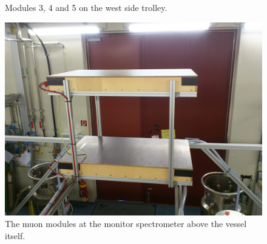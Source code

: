 \begin{figure}
\begin{minipage}{0.49\textwidth}
		\caption[East side modules]{Modules 3, 4 and 5 on the west side trolley. }
		\label{fig:westSide}
  	\end{minipage}
	
  \end{figure}

  
  \begin{figure}
	\begin{minipage}{0.3 \textwidth}
		\centering
		\includegraphics[width = \textwidth]{graphics/muonModules/monSpec/muonModules.jpg}
		\caption[Monitor spectrometer modules]{The muon modules at the monitor spectrometer above the vessel itself. }
		\label{fig:monSpecPanels}
	\end{minipage}
	\begin{minipage}{0.69\textwidth}

\end{minipage}
\end{figure}
